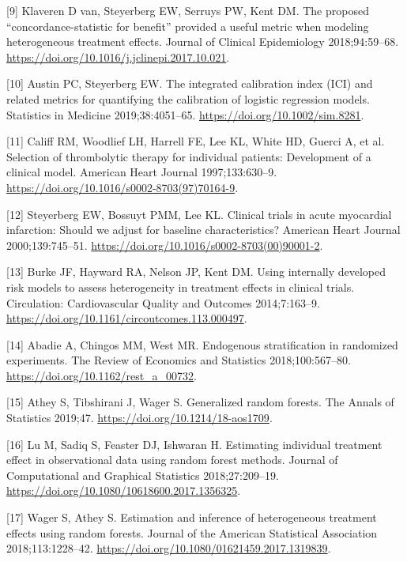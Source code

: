\documentclass[]{elsarticle} %
\newenvironment{cslreferences}%
  {}%
  {\par}
\begin{document}
\begin{cslreferences}
\leavevmode\hypertarget{ref-vanKlaveren2018}{}%
{[}9{]} Klaveren D van, Steyerberg EW, Serruys PW, Kent DM. The proposed
``concordance-statistic for benefit'' provided a useful metric when
modeling heterogeneous treatment effects. Journal of Clinical
Epidemiology 2018;94:59--68.
\url{https://doi.org/10.1016/j.jclinepi.2017.10.021}.

\leavevmode\hypertarget{ref-Austin2019}{}%
{[}10{]} Austin PC, Steyerberg EW. The integrated calibration index
(ICI) and related metrics for quantifying the calibration of logistic
regression models. Statistics in Medicine 2019;38:4051--65.
\url{https://doi.org/10.1002/sim.8281}.

\leavevmode\hypertarget{ref-Califf1997}{}%
{[}11{]} Califf RM, Woodlief LH, Harrell FE, Lee KL, White HD, Guerci A,
et al. Selection of thrombolytic therapy for individual patients:
Development of a clinical model. American Heart Journal 1997;133:630--9.
\url{https://doi.org/10.1016/s0002-8703(97)70164-9}.

\leavevmode\hypertarget{ref-Steyerberg2000}{}%
{[}12{]} Steyerberg EW, Bossuyt PMM, Lee KL. Clinical trials in acute
myocardial infarction: Should we adjust for baseline characteristics?
American Heart Journal 2000;139:745--51.
\url{https://doi.org/10.1016/s0002-8703(00)90001-2}.

\leavevmode\hypertarget{ref-Burke2014}{}%
{[}13{]} Burke JF, Hayward RA, Nelson JP, Kent DM. Using internally
developed risk models to assess heterogeneity in treatment effects in
clinical trials. Circulation: Cardiovascular Quality and Outcomes
2014;7:163--9. \url{https://doi.org/10.1161/circoutcomes.113.000497}.

\leavevmode\hypertarget{ref-Abadie2018}{}%
{[}14{]} Abadie A, Chingos MM, West MR. Endogenous stratification in
randomized experiments. The Review of Economics and Statistics
2018;100:567--80. \url{https://doi.org/10.1162/rest_a_00732}.

\leavevmode\hypertarget{ref-Athey2019}{}%
{[}15{]} Athey S, Tibshirani J, Wager S. Generalized random forests. The
Annals of Statistics 2019;47. \url{https://doi.org/10.1214/18-aos1709}.

\leavevmode\hypertarget{ref-Lu2018}{}%
{[}16{]} Lu M, Sadiq S, Feaster DJ, Ishwaran H. Estimating individual
treatment effect in observational data using random forest methods.
Journal of Computational and Graphical Statistics 2018;27:209--19.
\url{https://doi.org/10.1080/10618600.2017.1356325}.

\leavevmode\hypertarget{ref-Wager2018}{}%
{[}17{]} Wager S, Athey S. Estimation and inference of heterogeneous
treatment effects using random forests. Journal of the American
Statistical Association 2018;113:1228--42.
\url{https://doi.org/10.1080/01621459.2017.1319839}.
\end{cslreferences}

\setlength{\parindent}{0in}
\setlength{\leftskip}{0in}

\noindent
\end{document}
